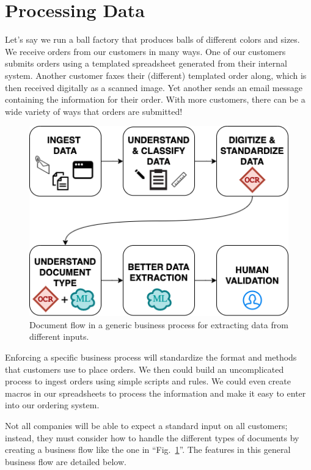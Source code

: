 \documentclass[conference]{IEEEtran}
\begin{document}
\section{Processing Data} \label{sectionProcessingData}

Let's say we run a ball factory that produces balls of different colors and sizes. We receive orders from our customers in many ways. One of our customers submits orders using a templated spreadsheet generated from their internal system. Another customer faxes their (different) templated order along, which is then received digitally as a scanned image. Yet another sends an email message containing the information for their order. With more customers, there can be a wide variety of ways that orders are submitted!

\begin{figure}[ht]
\centerline{\includegraphics[width=\columnwidth]{HighLevelFlow.png}}
\caption{Document flow in a generic business process for extracting data from different inputs.}
\label{figHighLevelFlow}
\end{figure}

Enforcing a specific business process will standardize the format and methods that customers use to place orders. We then could build an uncomplicated process to ingest orders using simple scripts and rules. We could even create macros in our spreadsheets to process the information and make it easy to enter into our ordering system.

Not all companies will be able to expect a standard input on all customers; instead, they must consider how to handle the different types of documents by creating a business flow like the one in ``Fig.~\ref{figHighLevelFlow}''. The features in this general business flow are detailed below.
\end{document}

